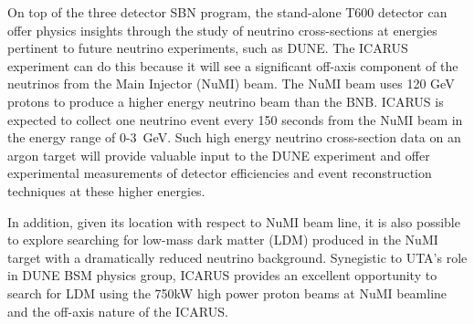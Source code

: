 On top of the three detector SBN program, the stand-alone T600 detector can offer physics insights through the study of neutrino cross-sections at energies pertinent to future neutrino experiments, such as DUNE. The ICARUS experiment can do this because it will see a significant off-axis component of the neutrinos from the Main Injector (NuMI) beam. The NuMI beam uses 120 GeV protons to produce a higher energy neutrino beam than the BNB. ICARUS is expected to collect one neutrino event every 150 seconds from the NuMI beam in the energy range of 0-3~GeV.  Such high energy neutrino cross-section data on an argon target will provide valuable input to the DUNE experiment and offer experimental measurements of detector efficiencies and event reconstruction techniques at these higher energies.

In addition, given its location with respect to NuMI beam line, it is also possible to explore searching for low-mass dark matter (LDM) produced in the NuMI target with a dramatically reduced neutrino background.  Synegistic to UTA's role in DUNE BSM physics group, ICARUS provides an excellent opportunity to search for LDM using the 750kW high power proton beams at NuMI beamline and the off-axis nature of the ICARUS.  



